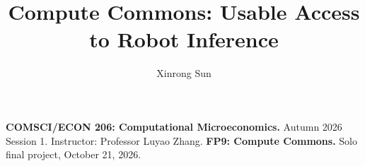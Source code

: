 \documentclass[sigconf,nonacm,10pt]{acmart}
\title{Compute Commons: Usable Access to Robot Inference}
\author{Xinrong Sun}
\affiliation{\institution{Duke Kunshan University}\city{Kunshan}\country{China}}
\begin{document}
\begin{teaserfigure}
\centering
\caption{Inherited foundations, project contribution and evidence. Public robot constraints define usable allocations; the final self-test separates deadline reports from execution-time manipulation. All numerical evidence is synthetic.}
\label{fig:teaser}
\end{teaserfigure}
\maketitle\raggedbottom
\noindent\textbf{COMSCI/ECON 206: Computational Microeconomics.} Autumn 2026 Session 1. Instructor: Professor Luyao Zhang. \textbf{FP9: Compute Commons.} Solo final project, October 21, 2026.

\clearpage\nobalance

\end{document}
